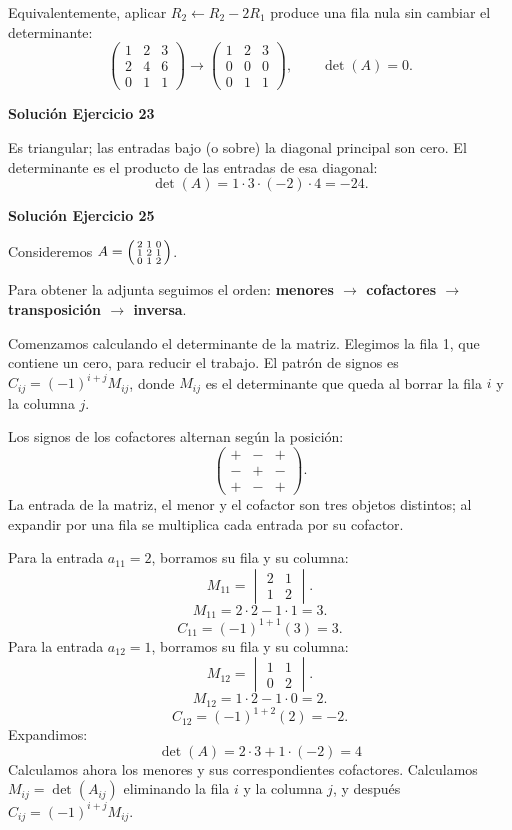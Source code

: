 \documentclass[12pt]{article}
\begin{document}
Equivalentemente, aplicar $R_2\leftarrow R_2-2R_1$ produce una fila nula sin cambiar el determinante:
\[
\begin{pmatrix}1&2&3\\2&4&6\\0&1&1\end{pmatrix}\longrightarrow\begin{pmatrix}1&2&3\\0&0&0\\0&1&1\end{pmatrix},\qquad \boxed{\det(A)=0}.
\]

\par\bigskip\noindent\textbf{Solución Ejercicio 23}\par\nobreak
Es triangular; las entradas bajo (o sobre) la diagonal principal son cero. El determinante es el producto de las entradas de esa diagonal:
\[
\det(A)=1\cdot 3\cdot (-2)\cdot 4=-24.
\]

\par\bigskip\noindent\textbf{Solución Ejercicio 25}\par\nobreak
Consideremos $A=\begin{psmallmatrix}2&1&0\\1&2&1\\0&1&2\end{psmallmatrix}$.

Para obtener la adjunta seguimos el orden: \textbf{menores $\to$ cofactores $\to$ transposición $\to$ inversa}.

Comenzamos calculando el determinante de la matriz.
Elegimos la fila 1, que contiene un cero, para reducir el trabajo. El patrón de signos es $C_{ij}=(-1)^{i+j}M_{ij}$, donde $M_{ij}$ es el determinante que queda al borrar la fila $i$ y la columna $j$.

Los signos de los cofactores alternan según la posición:
\[
\begin{pmatrix}
+&-&+\\
-&+&-\\
+&-&+
\end{pmatrix}.
\]
La entrada de la matriz, el menor y el cofactor son tres objetos distintos; al expandir por una fila se multiplica cada entrada por su cofactor.

Para la entrada $a_{11}=2$, borramos su fila y su columna:
\[
M_{11}=\begin{vmatrix}2&1\\1&2\end{vmatrix}.
\]
\[
M_{11}=2\cdot 2-1\cdot 1=3.
\]
\[
C_{11}=(-1)^{1+1}(3)=3.
\]
Para la entrada $a_{12}=1$, borramos su fila y su columna:
\[
M_{12}=\begin{vmatrix}1&1\\0&2\end{vmatrix}.
\]
\[
M_{12}=1\cdot 2-1\cdot 0=2.
\]
\[
C_{12}=(-1)^{1+2}(2)=-2.
\]
Expandimos: \[
\boxed{\det(A)=2\cdot 3 + 1\cdot (-2)=4}
\]
Calculamos ahora los menores y sus correspondientes cofactores. Calculamos $M_{ij}=\det(A_{ij})$ eliminando la fila $i$ y la columna $j$, y después $C_{ij}=(-1)^{i+j}M_{ij}$.
\end{document}
